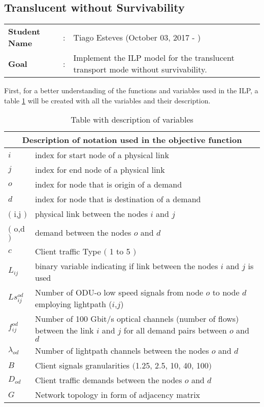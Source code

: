 \clearpage

\subsection{Translucent without Survivability}\label{ILP_Transluc_Survivability}
\begin{tcolorbox}	
\begin{tabular}{p{2.75cm} p{0.2cm} p{10.5cm}} 	
\textbf{Student Name}  &:& Tiago Esteves    (October 03, 2017 - )\\
\textbf{Goal}          &:& Implement the ILP model for the translucent transport mode without survivability.
\end{tabular}
\end{tcolorbox}
\vspace{11pt}

First, for a better understanding of the functions and variables used in the ILP, a table \ref{description_transluc} will be created with all the variables and their description. \\

\begin{table}[h!]
\centering
\begin{tabular}{ |p{1cm}||p{13cm}|}
 \hline
 \multicolumn{2}{|c|}{Description of notation used in the objective function} \\
 \hline
 \hline
 $i$ & index for start node of a physical link \\
 $j$ & index for end node of a physical link \\
 $o$ & index for node that is origin of a demand \\
 $d$ & index for node that is destination of a demand \\
 $($ i,j $)$ & physical link between the nodes $i$ and $j$ \\
 $($ o,d $)$ & demand between the nodes $o$ and $d$ \\
 $c$ & Client traffic Type $($ 1 to 5 $)$ \\
 $L_{ij}$ & binary variable indicating if link between the nodes $i$ and $j$ is used \\
 $Ls_{ij}^{od}$ & Number of ODU-o low speed signals from node $o$ to node $d$ employing lightpath ($i$,$j$) \\
 $f_{ij}^{od}$ & Number of 100 Gbit/s optical channels (number of flows) between the link $i$ and $j$ for all demand pairs between $o$ and $d$ \\
 $\lambda_{od}$ & Number of lightpath channels between the nodes $o$ and $d$ \\
 $B$ & Client signals granularities $($1.25, 2.5, 10, 40, 100$)$ \\
 $D_{od}$ & Client traffic demands between the nodes $o$ and $d$ \\
 $G$ & Network topology in form of adjacency matrix \\
 \hline
\end{tabular}
\caption{Table with description of variables}
\label{description_transluc}
\end{table}

